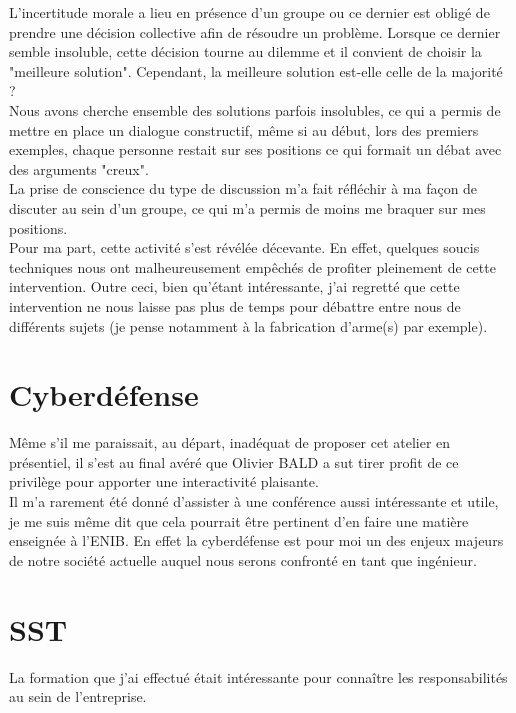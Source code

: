 L'incertitude morale a lieu en présence d'un groupe ou ce dernier est obligé de prendre une décision collective afin de résoudre un problème. Lorsque ce dernier semble insoluble, cette décision tourne au dilemme et il convient de choisir la "meilleure solution".
Cependant, la meilleure solution est-elle celle de la majorité ?\\

Nous avons cherche ensemble des solutions parfois insolubles, ce qui a permis de mettre en place un dialogue constructif, même si au début, lors des premiers exemples, chaque personne restait sur ses positions ce qui formait un débat avec des arguments "creux".\\

La prise de conscience du type de discussion m'a fait réfléchir à ma façon de discuter au sein d'un groupe, ce qui m'a permis de moins me braquer sur mes positions.\\


Pour ma part, cette activité s'est révélée décevante. En effet, quelques soucis techniques nous ont malheureusement empêchés de profiter pleinement de cette intervention. Outre ceci, bien qu'étant intéressante, j'ai regretté que cette intervention ne nous laisse pas plus de temps pour débattre entre nous de différents sujets (je pense notamment à la fabrication d'arme(s) par exemple).

\section{Cyberdéfense}

Même s'il me paraissait, au départ, inadéquat de proposer cet atelier en présentiel, il s'est au final avéré que Olivier BALD a sut tirer profit de ce privilège pour apporter une interactivité plaisante.\\
Il m'a rarement été donné d'assister à une conférence aussi intéressante et utile, je me suis même dit que cela pourrait être pertinent d'en faire une matière enseignée à l'ENIB. En effet la cyberdéfense est pour moi un des enjeux majeurs de notre société actuelle auquel nous serons confronté en tant que ingénieur.



\section{SST}


La formation que j'ai effectué était intéressante pour connaître les responsabilités au sein de l'entreprise. 

